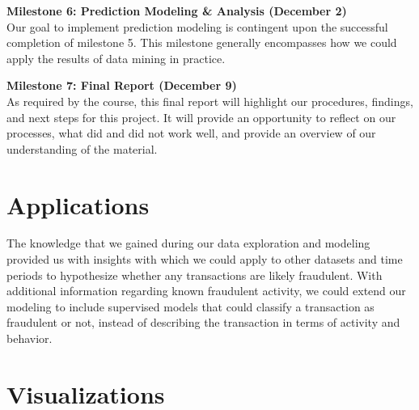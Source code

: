 \documentclass[sigconf]{acmart}
\begin{document}
\textbf{Milestone 6: Prediction Modeling \& Analysis (December 2)}\\
Our goal to implement prediction modeling is contingent upon the successful completion of milestone 5. This milestone generally encompasses how we could apply the results of data mining in practice.

\textbf{Milestone 7: Final Report (December 9)}\\
As required by the course, this final report will highlight our procedures, findings, and next steps for this project. It will provide an opportunity to reflect on our processes, what did and did not work well, and provide an overview of our understanding of the material.


\section{Applications}
The knowledge that we gained during our data exploration and modeling provided us with insights with which we could apply to other datasets and time periods to hypothesize whether any transactions are likely fraudulent. With additional information regarding known fraudulent activity, we could extend our modeling to include supervised models that could classify a transaction as fraudulent or not, instead of describing the transaction in terms of activity and behavior. 


\section{Visualizations}




 
\end{document}
